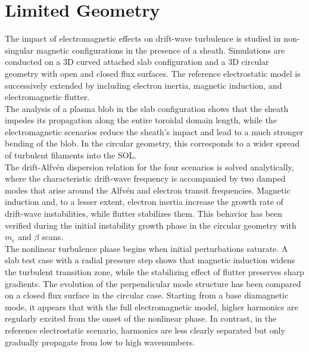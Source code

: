 \chapter{Limited Geometry}
\label{chap:analSimulations}

\begin{chaptersummarybox}
	The impact of electromagnetic effects on drift-wave turbulence is studied in non-singular magnetic configurations in the presence of a sheath. Simulations are conducted on a 3D curved attached slab configuration and a 3D circular geometry with open and closed flux surfaces. The reference electrostatic model is successively extended by including electron inertia, magnetic induction, and electromagnetic flutter. \\
	The analysis of a plasma blob in the slab configuration shows that the sheath impedes its propagation along the entire toroidal domain length, while the electromagnetic scenarios reduce the sheath's impact and lead to a much stronger bending of the blob. In the circular geometry, this corresponds to a wider spread of turbulent filaments into the SOL. \\
	The drift-Alfvén dispersion relation for the four scenarios is solved analytically, where the characteristic drift-wave frequency is accompanied by two damped modes that arise around the Alfvén and electron transit frequencies. Magnetic induction and, to a lesser extent, electron inertia increase the growth rate of drift-wave instabilities, while flutter stabilizes them. This behavior has been verified during the initial instability growth phase in the circular geometry with $m_e$ and $\beta$ scans. \\
	The nonlinear turbulence phase begins when initial perturbations saturate. A slab test case with a radial pressure step shows that magnetic induction widens the turbulent transition zone, while the stabilizing effect of flutter preserves sharp gradients. The evolution of the perpendicular mode structure has been compared on a closed flux surface in the circular case. Starting from a base diamagnetic mode, it appears that with the full electromagnetic model, higher harmonics are regularly excited from the onset of the nonlinear phase. In contrast, in the reference electrostatic scenario, harmonics are less clearly separated but only gradually propagate from low to high wavenumbers.
\end{chaptersummarybox}

\newpage



